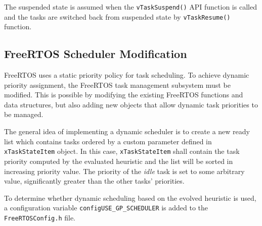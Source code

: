The suspended state is assumed when the \verb$vTaskSuspend()$ API function is called and the tasks are switched back from suspended state by \verb$vTaskResume()$ function.

\subsection{FreeRTOS Scheduler Modification}
FreeRTOS uses a static priority policy for task scheduling. 
To achieve dynamic priority assignment, the FreeRTOS task management subsystem must be modified. 
This is possible by modifying the existing FreeRTOS functions and data structures, but also adding new objects that allow dynamic task priorities to be managed. 

The general idea of implementing a dynamic scheduler is to create a new ready list which contains tasks ordered by a custom parameter defined in \verb$xTaskStateItem$ object.
In this case, \verb$xTaskStateItem$ shall contain the task priority computed by the evaluated heuristic and the list will be sorted in increasing priority value. 
The priority of the \textit{idle} task is set to some arbitrary value, significantly greater than the other tasks' priorities. 

To determine whether dynamic scheduling based on the evolved heuristic is used, a configuration variable \verb$configUSE_GP_SCHEDULER$ is added to the \verb$FreeRTOSConfig.h$ file. 

